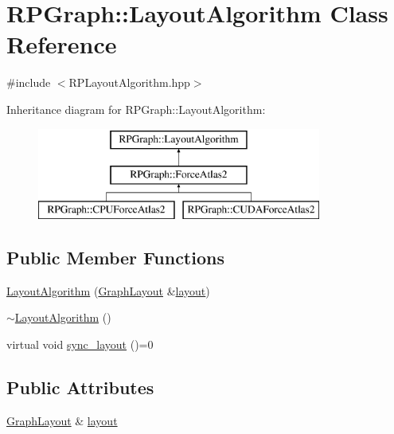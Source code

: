 \hypertarget{classRPGraph_1_1LayoutAlgorithm}{}\section{R\+P\+Graph\+:\+:Layout\+Algorithm Class Reference}
\label{classRPGraph_1_1LayoutAlgorithm}


{\ttfamily \#include $<$R\+P\+Layout\+Algorithm.\+hpp$>$}

Inheritance diagram for R\+P\+Graph\+:\+:Layout\+Algorithm\+:\begin{figure}[H]
\begin{center}
\leavevmode
\includegraphics[height=3.000000cm]{classRPGraph_1_1LayoutAlgorithm}
\end{center}
\end{figure}
\subsection*{Public Member Functions}
\begin{DoxyCompactItemize}
\item 
\mbox{\hyperlink{classRPGraph_1_1LayoutAlgorithm_a22686d4c7557f6f2dab0dfce50799b02}{Layout\+Algorithm}} (\mbox{\hyperlink{classRPGraph_1_1GraphLayout}{Graph\+Layout}} \&\mbox{\hyperlink{classRPGraph_1_1LayoutAlgorithm_ac2335a7ccaeb6cef789ea59b99353cf9}{layout}})
\item 
\mbox{\hyperlink{classRPGraph_1_1LayoutAlgorithm_a783dae7e8252ee7e2779aed90850e3d7}{$\sim$\+Layout\+Algorithm}} ()
\item 
virtual void \mbox{\hyperlink{classRPGraph_1_1LayoutAlgorithm_a70f3171d513b92d44f4784ff96c848c1}{sync\+\_\+layout}} ()=0
\end{DoxyCompactItemize}
\subsection*{Public Attributes}
\begin{DoxyCompactItemize}
\item 
\mbox{\hyperlink{classRPGraph_1_1GraphLayout}{Graph\+Layout}} \& \mbox{\hyperlink{classRPGraph_1_1LayoutAlgorithm_ac2335a7ccaeb6cef789ea59b99353cf9}{layout}}
\end{DoxyCompactItemize}


